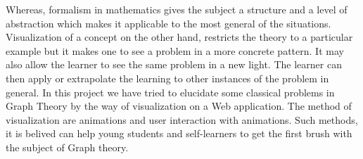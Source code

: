 Whereas, formalism in mathematics gives the subject a structure and a level of
abstraction which makes it applicable to the most general of the situations.
Visualization of a concept on the other hand, restricts the theory to a
particular example but it makes one to see a problem in a more concrete
pattern. It may also allow the learner to see the same problem in a new light. The
learner can then apply or extrapolate the learning to other instances of the problem in
general. 
In this project we have tried to elucidate some classical problems in
Graph Theory by the way of visualization on a Web application. The method of
visualization are animations and user interaction with animations. Such methods,
it is belived can help young students and self-learners to get the first brush
with the subject of Graph theory.
